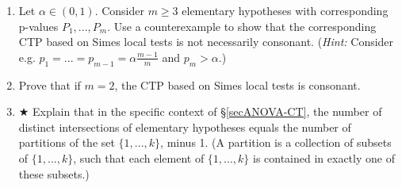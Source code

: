 \documentclass[11pt]{article}
\theoremstyle{plain}
\theoremstyle{definition}
\newcommand{\Hy}{\mathcal{H}}
\begin{document}
\begin{enumerate}
 
 Consider a coherent MTP for the family  $\Hy_1,...,\Hy_k$ and suppose the procedure has FWER at most $\alpha$. 
We will now prove that this MTP is the result of applying closed testing based on a collection of local tests with size at most $\alpha$. Thus, every coherent procedure can be seen as a closed testing procedure.

Consider the closure (under intersections) of the  family $\Hy_1,...,\Hy_k$ and define a local test for each hypothesis $\Hy$ in this closure as follows. If $\Hy$ is in the original family, reject $\Hy$ locally if and only  the original MTP rejects it. Otherwise, reject  $\Hy$ locally if and only if at least one of the locally rejected hypotheses (by the new tests) among $\Hy_1,...,\Hy_k$ is implied by $\Hy$. 


(a) Now consider the CTP based on these local tests.  Prove that this CTP has FWER (over all intersection hypotheses) at most $\alpha$.

(b)
Prove that among $\Hy_1,...,\Hy_k$, the hypotheses rejected by this CTP are the same as those rejected by the original MTP. 











\item 
Let $\alpha\in(0,1)$. Consider $m\geq 3$ elementary hypotheses with corresponding p-values $P_1,...,P_m$. Use a counterexample to show that the corresponding CTP based on Simes local tests is not necessarily consonant. (\emph{Hint:} Consider e.g. $p_1=...=p_{m-1}=\alpha\frac{m-1}{m}$ and $p_m>\alpha$.)

\item
Prove that if $m=2$, the CTP based on Simes local tests is consonant.


\item $\bigstar$ Explain that in the specific context of \S\ref{secANOVA-CT}, the number of distinct intersections of elementary hypotheses equals the number of partitions of the set $\{1,...,k\}$, minus 1. (A partition is a collection of subsets of $\{1,...,k\}$, such that each element of  $\{1,...,k\}$ is contained in exactly  one of these subsets.)


\end{enumerate}
\end{document}
